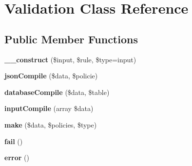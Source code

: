 \hypertarget{class_zest_1_1_validation_1_1_validation}{}\section{Validation Class Reference}
\label{class_zest_1_1_validation_1_1_validation}
\subsection*{Public Member Functions}
\begin{DoxyCompactItemize}
\item 
\mbox{\label{class_zest_1_1_validation_1_1_validation_a2b35f913a8b602b5c758aae382fde4a0}} 
{\bfseries \+\_\+\+\_\+construct} (\$input, \$rule, \$type=\textquotesingle{}input\textquotesingle{})
\item 
\mbox{\label{class_zest_1_1_validation_1_1_validation_a433c7cc2b9fa07df1cd841f52860ecce}} 
{\bfseries json\+Compile} (\$data, \$policie)
\item 
\mbox{\label{class_zest_1_1_validation_1_1_validation_adf09c6202d7d3e6f0e15d113355a2405}} 
{\bfseries database\+Compile} (\$data, \$table)
\item 
\mbox{\label{class_zest_1_1_validation_1_1_validation_a98bc1374f5435aeac4b2d4e7e7d6d632}} 
{\bfseries input\+Compile} (array \$data)
\item 
\mbox{\label{class_zest_1_1_validation_1_1_validation_a8963f1be1967bc614c8f4685cd0fb99e}} 
{\bfseries make} (\$data, \$policies, \$type)
\item 
\mbox{\label{class_zest_1_1_validation_1_1_validation_ac59dac7398e43cca6e7a717ac210c750}} 
{\bfseries fail} ()
\item 
\mbox{\label{class_zest_1_1_validation_1_1_validation_a43b8d30b879d4f09ceb059b02af2bc02}} 
{\bfseries error} ()
\item 
\mbox{\label{class_zest_1_1_validation_1_1_validation_a8b23dbb48f0c3c94725695191d06981a}} 

\end{DoxyCompactItemize}
